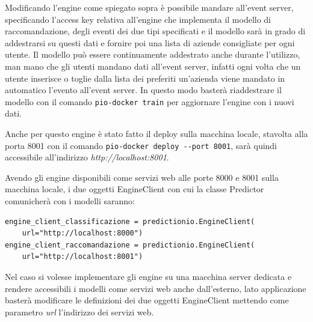 Modificando l'engine come spiegato sopra è possibile mandare all'event server, specificando l'access key relativa all'engine che implementa il modello di raccomandazione, degli eventi dei due tipi specificati e il modello sarà in grado di addestrarsi su questi dati e fornire poi una lista di aziende consigliate per ogni utente. Il modello può essere continuamente addestrato anche durante l'utilizzo, man mano che gli utenti mandano dati all'event server, infatti ogni volta che un utente inserisce o toglie dalla lista dei preferiti un'azienda viene mandato in automatico l'evento all'event server. In questo modo basterà riaddestrare il modello con il comando \verb+pio-docker train+ per aggiornare l'engine con i nuovi dati.

Anche per questo engine è stato fatto il deploy sulla macchina locale, stavolta alla porta 8001 con il comando \verb+pio-docker deploy --port 8001+, sarà quindi accessibile all'indirizzo \textit{http://localhost:8001}.

Avendo gli engine disponibili come servizi web alle porte 8000 e 8001 sulla macchina locale, i due oggetti EngineClient con cui la classe Predictor comunicherà con i modelli saranno:
\begin{verbatim}
engine_client_classificazione = predictionio.EngineClient(
	url="http://localhost:8000")
engine_client_raccomandazione = predictionio.EngineClient(
	url="http://localhost:8001")
\end{verbatim}

Nel caso si volesse implementare gli engine su una macchina server dedicata e rendere accessibili i modelli come servizi web anche dall'esterno, lato applicazione basterà modificare le definizioni dei due oggetti EngineClient mettendo come parametro \textit{url} l'indirizzo dei servizi web.